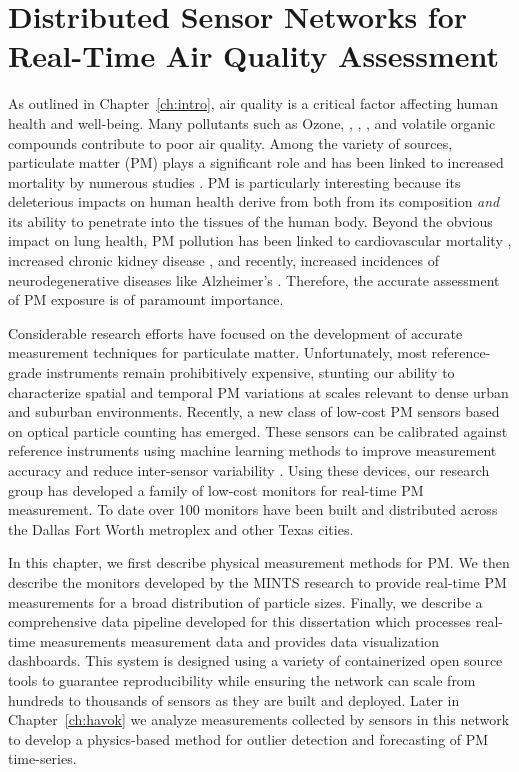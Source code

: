 \chapter{Distributed Sensor Networks for Real-Time Air Quality Assessment}\label{ch:air-network}

As outlined in Chapter~\ref{ch:intro}, air quality is a critical factor
affecting human health and well-being. Many pollutants such as Ozone, ,
, , and volatile organic compounds contribute to poor air
quality. Among the variety of sources, particulate matter (PM) plays a
significant role and has
been linked to increased mortality by numerous studies
\cite{pm-mortality-six-cities, pm-mortality-2}. PM is particularly interesting
because its deleterious impacts on human health derive from both from its
composition \textit{and} its ability to penetrate into the tissues of the human
body. Beyond the obvious impact on lung health, PM pollution has been linked to
cardiovascular mortality \cite{pm-cardiovascular}, increased chronic kidney
disease \cite{pm-kidneys}, and recently, increased incidences of
neurodegenerative diseases like Alzheimer's \cite{pm-neurodegenerative,
  pm-neurodegenerative-2}. Therefore, the accurate assessment of PM exposure is
of paramount importance.

Considerable research efforts have focused on the development of accurate
measurement techniques for particulate matter. Unfortunately, most
reference-grade instruments remain prohibitively expensive, stunting our ability
to characterize spatial and temporal PM variations at scales relevant to dense
urban and suburban environments. Recently, a new class of low-cost PM sensors
based on optical particle counting has emerged. These sensors can be calibrated
against reference instruments using machine learning methods to improve
measurement accuracy and reduce inter-sensor variability
\cite{pm-calibration-lakitha}. Using these devices, our research group has
developed a family of low-cost monitors for real-time PM measurement. To date
over 100 monitors have been built and distributed across the Dallas Fort Worth
metroplex and other Texas cities.

In this chapter, we first describe physical measurement methods for PM. We then
describe the monitors developed by the MINTS research to provide real-time PM
measurements for a broad distribution of particle sizes. Finally, we describe
a comprehensive data pipeline developed for this dissertation which processes
real-time measurements measurement data and provides data visualization
dashboards. This system is designed using a variety of containerized open source
tools to guarantee reproducibility while ensuring the network can scale from
hundreds to thousands of sensors as they are built and deployed. Later
in Chapter~\ref{ch:havok} we analyze measurements collected
by sensors in this network to develop a physics-based method for outlier
detection and forecasting of PM time-series.

